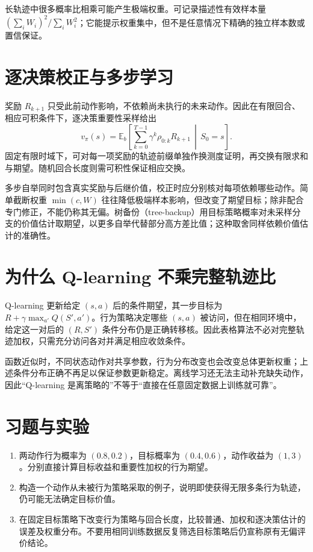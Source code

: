 \documentclass[UTF8,12pt,a4paper,fontset=fandol]{ctexbook}
\begin{document}
长轨迹中很多概率比相乘可能产生极端权重。可记录描述性有效样本量 $(\sum_iW_i)^2/\sum_iW_i^2$；它能提示权重集中，但不是任意情况下精确的独立样本数或置信保证。

\section{逐决策校正与多步学习}

奖励 $R_{k+1}$ 只受此前动作影响，不依赖尚未执行的未来动作。因此在有限回合、相应可积条件下，逐决策重要性采样给出
\[
v_\pi(s)=\mathbb E_b\!\left[\sum_{k=0}^{T-1}\gamma^k\rho_{0:k}R_{k+1}\,\middle|\,S_0=s\right].
\]
固定有限时域下，可对每一项奖励的轨迹前缀单独作换测度证明，再交换有限求和与期望。随机回合长度则需可积性保证相应交换。

多步自举同时包含真实奖励与后继价值，校正时应分别核对每项依赖哪些动作。简单截断权重 $\min(c,W)$ 往往降低极端样本影响，但改变了期望目标；除非配合专门修正，不能仍称其无偏。树备份（tree-backup）用目标策略概率对未采样分支的价值估计取期望，以更多自举代替部分高方差比值；这种取舍同样依赖价值估计的准确性。

\section{为什么 Q-learning 不乘完整轨迹比}

Q-learning 更新给定 $(s,a)$ 后的条件期望，其一步目标为 $R+\gamma\max_{a'}Q(S',a')$。行为策略决定哪些 $(s,a)$ 被访问，但在相同环境中，给定这一对后的 $(R,S')$ 条件分布仍是正确转移核。因此表格算法不必对完整轨迹加权，只需充分访问各对并满足相应收敛条件。

函数近似时，不同状态动作对共享参数，行为分布改变也会改变总体更新权重；上述条件分布正确不再足以保证参数更新稳定。离线学习还无法主动补充缺失动作，因此“Q-learning 是离策略的”不等于“直接在任意固定数据上训练就可靠”。

\section{习题与实验}
\begin{enumerate}
\item 两动作行为概率为 $(0.8,0.2)$，目标概率为 $(0.4,0.6)$，动作收益为 $(1,3)$。分别直接计算目标收益和重要性加权的行为期望。
\item 构造一个动作从未被行为策略采取的例子，说明即使获得无限多条行为轨迹，仍可能无法确定目标价值。
\item 在固定目标策略下改变行为策略与回合长度，比较普通、加权和逐决策估计的误差及权重分布。不要用相同训练数据反复筛选目标策略后仍宣称原有无偏评价结论。
\end{enumerate}
\end{document}
